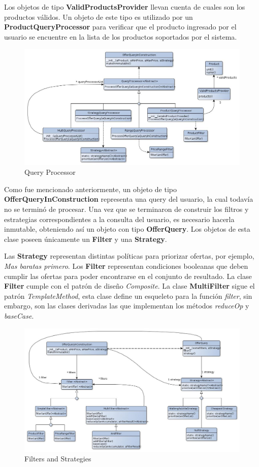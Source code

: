 \documentclass[10pt, a4paper]{article}
\begin{document}
Los objetos de tipo \textbf{ValidProductsProvider} llevan cuenta de cuales son los productos válidos. Un objeto de este tipo es utilizado por un \textbf{ProductQueryProcessor} para verificar que el producto ingresado por el usuario se encuentre en la lista de los productos soportados por el sistema.

\begin{figure}[H]
\centering
\includegraphics[scale=0.5]{graphics/queryProcessor_class.jpg}
\caption{Query Processor}
\end{figure}

Como fue mencionado anteriormente, un objeto de tipo \textbf{OfferQueryInConstruction} representa una query del usuario, la cual todavía no se terminó de procesar. Una vez que se terminaron de construir los filtros y estrategias correspondientes a la consulta del usuario, es necesario hacerla inmutable, obteniendo así un objeto con tipo \textbf{OfferQuery}. Los objetos de esta clase poseen únicamente un \textbf{Filter} y una \textbf{Strategy}.

Las \textbf{Strategy} representan distintas políticas para priorizar ofertas, por ejemplo, \emph{Mas baratas primero}. Los \textbf{Filter} representan condiciones booleanas que deben cumplir las ofertas para poder encontrarse en el conjunto de resultado. La clase \textbf{Filter} cumple con el patrón de diseño \emph{Composite}. La clase \textbf{MultiFilter} sigue el patrón \emph{TemplateMethod}, esta clase define un esqueleto para la función \emph{filter}, sin embargo, son las clases derivadas las que implementan los métodos \emph{reduceOp} y \emph{baseCase}.

\begin{figure}[H]
\centering
\includegraphics[width=\textwidth]{graphics/filter_class.jpg}
\caption{Filters and Strategies}
\end{figure}
\end{document}
